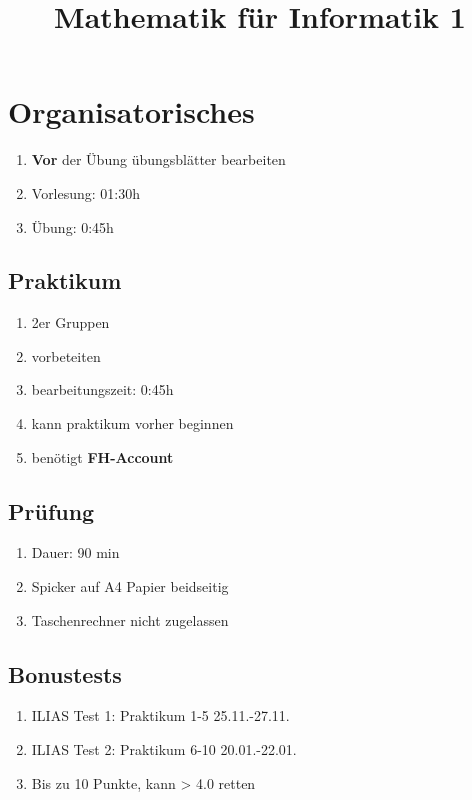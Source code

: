 \documentclass[11pt, a4paper]{article}
\begin{document}
\title{Mathematik für Informatik 1}
\maketitle

\thispagestyle{empty}


\newpage

\tableofcontents

\newpage

\section{Organisatorisches}
\begin{enumerate}
\item \textbf{Vor} der Übung übungsblätter bearbeiten
\item Vorlesung: 01:30h
\item Übung: 0:45h
\end{enumerate}

\subsection{Praktikum}
\begin{enumerate}
\item 2er Gruppen
\item vorbeteiten
\item bearbeitungszeit: 0:45h
\item kann praktikum vorher beginnen
\item benötigt \textbf{FH-Account}
\end{enumerate}
\subsection{Prüfung}
\begin{enumerate}
\item Dauer: 90 min
\item Spicker auf A4 Papier beidseitig
\item Taschenrechner nicht zugelassen
\end{enumerate}

\subsection{Bonustests}
\begin{enumerate}
\item ILIAS Test 1: Praktikum 1-5 25.11.-27.11.
\item ILIAS Test 2: Praktikum 6-10 20.01.-22.01.
\item Bis zu 10 Punkte, kann > 4.0 retten
\end{enumerate}
\end{document}
